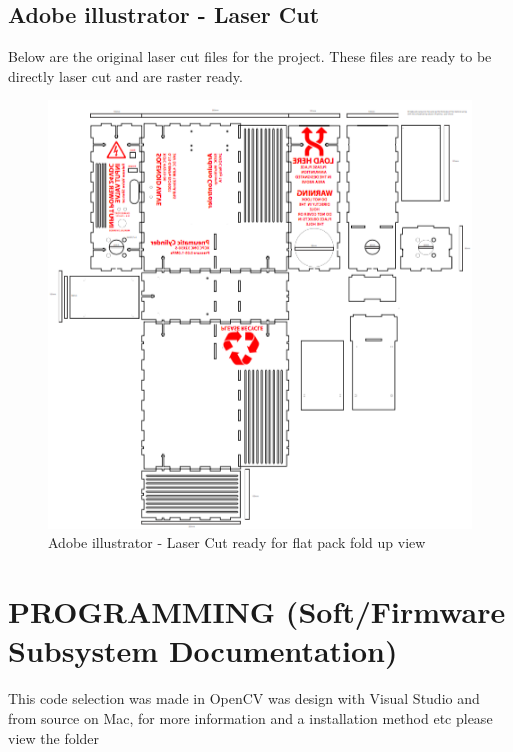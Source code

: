 \documentclass[a4paper, 10pt]{IEEEconf}
\begin{document}
\clearpage
\subsection{Adobe illustrator - Laser Cut}
Below are the original laser cut files for the project. These files are ready to be directly laser cut and are raster ready.
\begin{figure}[H]
  \includegraphics[width=\linewidth, center]{images/QuickView.png}
  \caption{Adobe illustrator - Laser Cut ready for flat pack fold up view}
  \label{fig:Adobe illustrator - Laser Cut ready for flat pack fold up view}
\end{figure}

\clearpage
\section{PROGRAMMING (Soft/Firmware Subsystem Documentation)}
This code selection was made in OpenCV was design with Visual Studio and from source on Mac, for more information and a installation method etc please view the folder 
\end{document}
